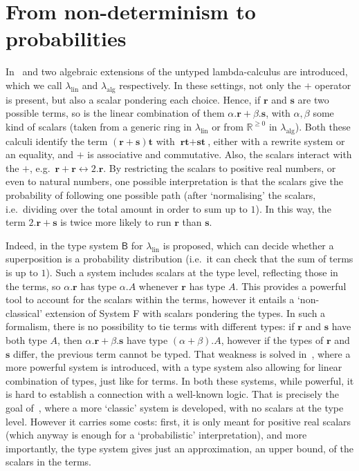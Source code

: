 \documentclass[final,copyright,creativecommons]{eptcs}
\newcommand{\ve}[1]{\ensuremath{\mathrm{\textbf{#1}}}}
\theoremstyle{definition}
\begin{document}
\section{From non-determinism to probabilities}\label{sec:prob}
In~\cite{ArrighiDowekRTA08} and \cite{VauxMSCS09} two algebraic extensions of the untyped lambda-calculus are introduced, which we call $\lambda_{\textrm{lin}}$ and $\lambda_{\textrm{alg}}$ respectively. In these settings, not only the $+$ operator is present, but also a scalar pondering each choice. Hence, if $\ve r$ and $\ve s$ are two possible terms, so is the linear combination of them $\alpha.\ve r+\beta.\ve s$, with $\alpha,\beta$ some kind of scalars (taken from a generic ring in $\lambda_{\textrm{lin}}$ or from $\mathbb{R}^{\geq 0}$ in $\lambda_{\textrm{alg}}$). Both these calculi identify the term $(\ve r+\ve s)\ve t$ with $\ve r\ve t+\ve s\ve t$, either with a rewrite system or an equality, and $+$ is associative and commutative. Also, the scalars interact with the $+$, e.g.~$\ve r+\ve r\leftrightarrow 2.\ve r$. By restricting the scalars to positive real numbers,
or even to natural numbers, one possible interpretation is that the scalars give the probability of following one possible path (after `normalising' the scalars, i.e.~dividing over the total amount in order to sum up to $1$).
In this way, the term $2.\ve r+\ve s$ is twice more likely to run $\ve r$ than $\ve s$.

Indeed, in \cite[\S6]{ArrighiDiazcaroLMCS12} the type system $\mathsf{B}$ for $\lambda_{\textrm{lin}}$ is proposed, which can decide whether a superposition is a probability distribution (i.e.~it can check that the sum of terms is up to $1$). Such a system includes scalars at the type level, reflecting those in the terms, so $\alpha.\ve r$ has type $\alpha.A$ whenever $\ve r$ has type $A$. This provides a powerful tool to account for the scalars within the terms, however it entails a `non-classical' extension of System F with scalars pondering the types. In such a formalism, there is no possibility to tie terms with different types: if $\ve r$ and $\ve s$ have both type $A$, then $\alpha.\ve r+\beta.\ve s$ have type $(\alpha+\beta).A$, however if the types of $\ve r$ and $\ve s$ differ, the previous term cannot be typed.
That weakness is solved in~\cite{ArrighiDiazcaroValironDCM11}, where a more powerful system is introduced, with a type system also allowing for linear combination of types, just like for terms. In both these systems, while powerful, it is hard to establish a connection with a well-known logic. That is precisely the goal of~\cite{BuirasDiazcaroJaskelioffLSFA11}, where a more `classic' system is developed, with no scalars at the type level. However it carries some costs: first, it is only meant for positive real scalars (which anyway is enough for a `probabilistic' interpretation), and more importantly, the type system gives just an approximation, an upper bound, of the scalars in the terms.
\end{document}
